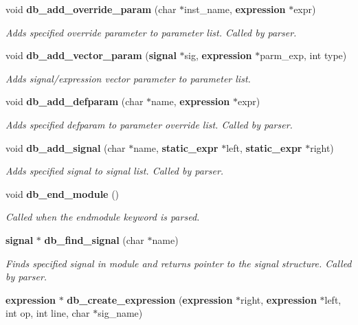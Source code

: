 \begin{CompactItemize}
void {\bf db\_\-add\_\-override\_\-param} (char $\ast$inst\_\-name, {\bf expression} $\ast$expr)
\begin{CompactList}\small\item\em Adds specified override parameter to parameter list. Called by parser. \item\end{CompactList}\item 
void {\bf db\_\-add\_\-vector\_\-param} ({\bf signal} $\ast$sig, {\bf expression} $\ast$parm\_\-exp, int type)
\begin{CompactList}\small\item\em Adds signal/expression vector parameter to parameter list. \item\end{CompactList}\item 
void {\bf db\_\-add\_\-defparam} (char $\ast$name, {\bf expression} $\ast$expr)
\begin{CompactList}\small\item\em Adds specified defparam to parameter override list. Called by parser. \item\end{CompactList}\item 
void {\bf db\_\-add\_\-signal} (char $\ast$name, {\bf static\_\-expr} $\ast$left, {\bf static\_\-expr} $\ast$right)
\begin{CompactList}\small\item\em Adds specified signal to signal list. Called by parser. \item\end{CompactList}\item 
void {\bf db\_\-end\_\-module} ()
\begin{CompactList}\small\item\em Called when the endmodule keyword is parsed. \item\end{CompactList}\item 
{\bf signal} $\ast$ {\bf db\_\-find\_\-signal} (char $\ast$name)
\begin{CompactList}\small\item\em Finds specified signal in module and returns pointer to the signal structure. Called by parser. \item\end{CompactList}\item 
{\bf expression} $\ast$ {\bf db\_\-create\_\-expression} ({\bf expression} $\ast$right, {\bf expression} $\ast$left, int op, int line, char $\ast$sig\_\-name)

\end{CompactItemize}
